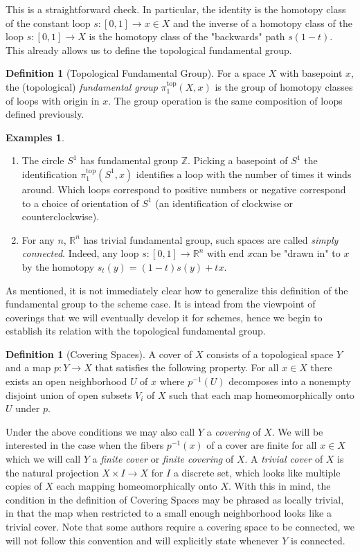 \documentclass{article}
\theoremstyle{definition}
\newtheorem{definition}[theorem]{Definition}
\newtheorem{examples}[theorem]{Examples}
\theoremstyle{remark}
\newcommand{\R}{\mathbb{R}}
\newcommand{\Z}{\mathbb{Z}}
\begin{document}
This is a straightforward check. 
In particular, the identity is the homotopy class of the constant loop $s: [0,1] \to x \in X$ and the inverse of a homotopy class of the loop $s: [0,1] \to X$ is the homotopy class of the "backwards" path $s(1-t)$.
This already allows us to define the topological fundamental group.
\begin{definition}[Topological Fundamental Group]
	For a space $X$ with basepoint $x$, the (topological) \textit{fundamental group} $\pi^{\text{top}}_1(X,x)$	is the group of homotopy classes of loops with origin in $x$.
	The group operation is the same composition of loops defined previously.
\end{definition}

\begin{examples} \text{} 
	\begin{enumerate}
		\item The circle $S^1$ has fundamental group $\Z$. 
			Picking a basepoint of $S^1$ the identification $\pi_1^{\text{top}}(S^1,x)$ identifies a loop with the number of times it winds around.
			Which loops correspond to positive numbers or negative correspond to a choice of orientation of $S^1$ (an identification of clockwise or counterclockwise). 
		\item For any $n$, $\R^n$ has trivial fundamental group, such spaces are called \textit{simply connected}.
			Indeed, any loop $s: [0,1] \to \R^n$ with end $x $can be "drawn in" to $x$ by the homotopy $s_t(y) = (1-t)s(y) + tx$.
	\end{enumerate}
	
\end{examples}

As mentioned, it is not immediately clear how to generalize this definition of the fundamental group to the scheme case.
It is intead from the viewpoint of coverings that we will eventually develop it for schemes, hence we begin to establish its relation with the topological fundamental group.

\begin{definition}[Covering Spaces]
A cover of $X$ consists of a topological space $Y$ and a map $p:Y \to X$ that satisfies the following property. 
	For all $x \in X$ there exists an open neighborhood $U$ of $x$ where $p^{-1}(U)$ decomposes into a nonempty disjoint union of open subsets $V_i$ of $X$ such that each map homeomorphically onto $U$ under $p$.
\end{definition}

Under the above conditions we may also call $Y$ a \textit{covering} of $X$.
We will be interested in the case when the fibers $p^{-1}(x)$ of a cover are finite for all $x \in X$ which we will call $Y$ a \textit{finite cover} or \textit{finite covering} of $X$.
A \textit{trivial cover} of $X$ is the natural projection $X \times I \to X$ for $I$ a discrete set, which looks like multiple copies of $X$ each mapping homeomorphically onto $X$.
With this in mind, the condition in the definition of Covering Spaces may be phrased as locally trivial, in that the map when restricted to a small enough neighborhood looks like a trivial cover.
Note that some authors require a covering space to be connected, we will not follow this convention and will explicitly state whenever $Y$ is connected.
\end{document}
